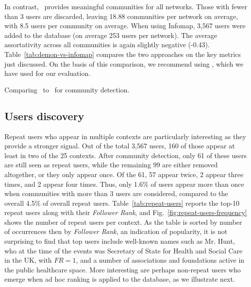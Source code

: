 In contrast, \infomap~provides meaningful communities for all networks.
Those with fewer than 3 users are discarded, leaving  18.88 communities per network on average, with 8.5 users per community on average.
When using Infomap, 3,567 users were added to the database (on average 253 users per network).
The average assortativity across all communities is again slightly negative (-0.43).
%
Table~\ref{tab:demon-vs-infomap} compares the two approaches on the key metrics just discussed. On the basis of this comparison, we recommend using \infomap, which we have used for  our evaluation.

\begin{table}
	\vspace{-10pt}
		\footnotesize
	\resizebox{\textwidth}{!}{
	    
	}
	\caption{Comparing \demon~to \infomap~for community detection.}
	\label{tab:demon-vs-infomap}
	\vspace{-20pt}
\end{table}

\subsection{Users discovery}  \label{sec:users}

Repeat users who appear in multiple contexts are particularly interesting as they provide a stronger signal. 
Out of the total 3,567 users, 160 of those appear at least in two of the 25 contexts.
After community detection, only 61 of these users are still seen as repeat users,
while the remaining 99 are either removed altogether, or they only appear once.
Of the 61, 57 appear twice, 2 appear three times, and 2 appear four times. 
Thus, only 1.6\% of users appear more than once when communities with more than 3 users are considered, compared to the overall 4.5\% of overall repeat users.
%
Table~\ref{tab:repeat-users} reports the top-10 repeat users along with their \textit{Follower Rank}, and Fig.~\ref{fig:repeat-users-frequency} shows the number of repeat users per context.
As the table is sorted by number of occurrences then by \textit{Follower Rank}, an indication of popularity,  it is not surprising to find that top users include well-known names such as Mr. Hunt, who at the time of the events was Secretary of State for Health and Social Care in the UK, with $FR =1$, and a number of associations and foundations active in the public healthcare space.
More interesting are perhaps non-repeat users who emerge when ad hoc ranking is applied to the database, as we illustrate next.

